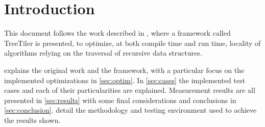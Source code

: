 \section{Introduction}
\label{sec:intro}

This document follows the work described in \cite{tree_tiler}, where a framework called TreeTiler is presented, to optimize, at both compile time and run time, locality of algorithms relying on the traversal of recursive data structures.

 explains the original work and the \treetiler framework, with a particular focus on the implemented optimizations in \cref{sec:optim}. In \cref{sec:cases} the implemented test cases and each of their particularities are explained. Measurement results are all presented in \cref{sec:results} with some final considerations and conclusions in \cref{sec:conclusion}.  detail the methodology and testing environment used to achieve the results shown.